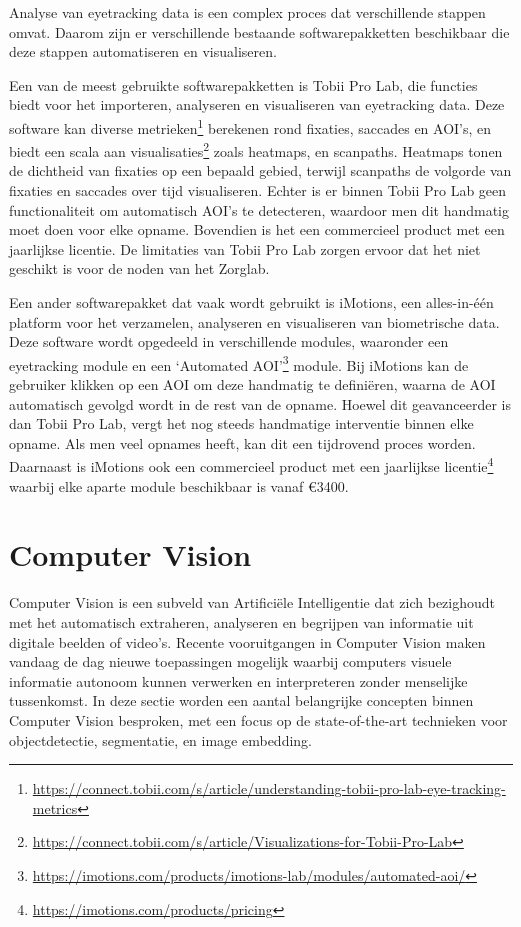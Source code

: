 Analyse van eyetracking data is een complex proces dat verschillende stappen omvat. Daarom zijn er verschillende bestaande softwarepakketten beschikbaar die deze stappen automatiseren en visualiseren.
\newline \par
Een van de meest gebruikte softwarepakketten is Tobii Pro Lab, die functies biedt voor het importeren, analyseren en visualiseren van eyetracking data.
Deze software kan diverse metrieken\footnote{\url{https://connect.tobii.com/s/article/understanding-tobii-pro-lab-eye-tracking-metrics}} berekenen rond fixaties, 
saccades en AOI's, en biedt een scala aan visualisaties\footnote{\url{https://connect.tobii.com/s/article/Visualizations-for-Tobii-Pro-Lab}} zoals heatmaps, en scanpaths.
Heatmaps tonen de dichtheid van fixaties op een bepaald gebied, terwijl scanpaths de volgorde van fixaties en saccades over tijd visualiseren.
Echter is er binnen Tobii Pro Lab geen functionaliteit om automatisch AOI's te detecteren, waardoor men dit handmatig moet doen voor elke opname.
Bovendien is het een commercieel product met een jaarlijkse licentie.
De limitaties van Tobii Pro Lab zorgen ervoor dat het niet geschikt is voor de noden van het Zorglab.
\newline \par
Een ander softwarepakket dat vaak wordt gebruikt is iMotions, een alles-in-één platform voor het verzamelen, analyseren en visualiseren van biometrische data.
Deze software wordt opgedeeld in verschillende modules, waaronder een eyetracking module en een `Automated AOI'\footnote{\url{https://imotions.com/products/imotions-lab/modules/automated-aoi/}} module.
Bij iMotions kan de gebruiker klikken op een AOI om deze handmatig te definiëren, waarna de AOI automatisch gevolgd wordt in de rest van de opname.
Hoewel dit geavanceerder is dan Tobii Pro Lab, vergt het nog steeds handmatige interventie binnen elke opname. Als men veel opnames heeft, kan dit een tijdrovend proces worden.
Daarnaast is iMotions ook een commercieel product met een jaarlijkse licentie\footnote{\url{https://imotions.com/products/pricing}} waarbij elke aparte module beschikbaar is vanaf €3400.

\section{Computer Vision}

Computer Vision is een subveld van Artificiële Intelligentie dat zich bezighoudt met het automatisch extraheren, analyseren en begrijpen van informatie uit digitale beelden of video's.
Recente vooruitgangen in Computer Vision maken vandaag de dag nieuwe toepassingen mogelijk waarbij computers visuele informatie autonoom kunnen verwerken en interpreteren zonder menselijke tussenkomst.
In deze sectie worden een aantal belangrijke concepten binnen Computer Vision besproken, met een focus op de state-of-the-art technieken voor objectdetectie, segmentatie, en image embedding.


